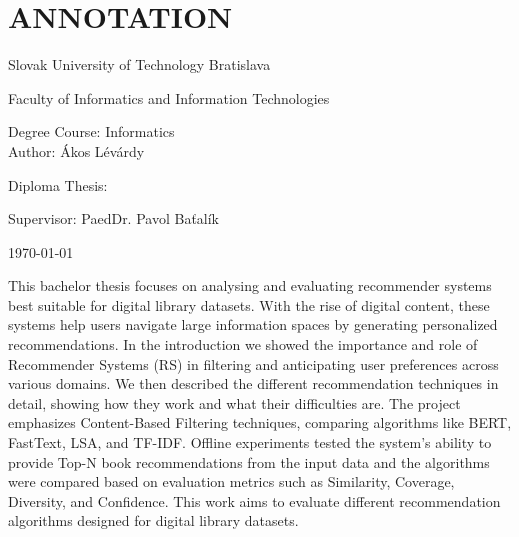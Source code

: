 \documentclass[\myFontSize,oneside,english,hidelinks,a4paper]{article}
\begin{document}
\titleformat{\section}{\LARGE\bfseries}{\thesection}{1em}{}
\titleformat{\subsection}{\Large\bfseries}{\thesubsection}{1em}{}
\titleformat{\subsubsection}{\Large\bfseries}{\thesubsubsection}{1em}{}

%
%

\newpage{}
\thispagestyle{empty}
\mbox{}

\newpage{} 
\thispagestyle{empty}
\section*{ANNOTATION}
\begin{minipage}[t]{1\columnwidth}%
Slovak University of Technology Bratislava 

Faculty of Informatics and Information Technologies

Degree Course: Informatics\\

Author: Ákos Lévárdy

Diploma Thesis: \thesisTitle

Supervisor: PaedDr. Pavol Baťalík

\today%
\end{minipage}
\bigskip{}

This bachelor thesis focuses on analysing and evaluating recommender systems best suitable for digital library datasets. With the rise of digital content, these systems help users navigate large information spaces by generating personalized recommendations. In the introduction we showed the importance and role of Recommender Systems (RS) in filtering and anticipating user preferences across various domains. We then described the different recommendation techniques in detail, showing how they work and what their difficulties are. The project emphasizes Content-Based Filtering techniques, comparing algorithms like BERT, FastText, LSA, and TF-IDF. Offline experiments tested the system’s ability to provide Top-N book recommendations from the input data and the algorithms were compared based on evaluation metrics such as Similarity, Coverage, Diversity, and Confidence. This work aims to evaluate different recommendation algorithms designed for digital library datasets.
\end{document}
